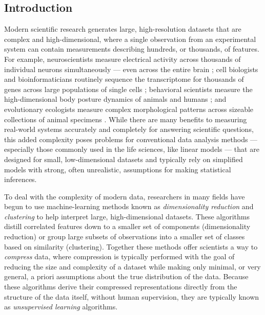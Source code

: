\documentclass[11pt,a4paper,twoside]{book}
\begin{document}
\begin{doublespace}
\section{Introduction}
Modern scientific research generates large, high-resolution datasets that are complex and high-dimensional, where a single observation from an experimental system can contain measurements describing hundreds, or thousands, of features. For example, neuroscientists measure electrical activity across thousands of individual neurons simultaneously \citep{jun2017fully, stringer2019high, stringer2019spontaneous} --- even across the entire brain \citep{ahrens2012brain,ahrens2013whole}; cell biologists and bioinformaticians routinely sequence the transcriptome for thousands of genes across large populations of single cells \citep{samusik2016automated, la2018rna, becht2019dimensionality, linderman2019fast}; behavioral scientists measure the high-dimensional body posture dynamics of animals and humans \citep{stephens2008dimensionality, stephens2011emergence, kain2013leg, berman2014mapping, wiltschko2015mapping, klibaite2017unsupervised, Costa1501, cande2018optogenetic, mathis2018deeplabcut, chambers2019pose, gunel2019deepfly3d, graving2019deepposekit, klibaite2019interacting,
nath2019using,pereira2019fast, bala2020openmonkeystudio, ebbesen2020social, karashchuk2020anipose}; and evolutionary ecologists measure complex morphological patterns across sizeable collections of animal specimens \citep{cuthill2017biology, cuthill2019deep, ezray2019unsupervised, wham2019measuring, zhang2019shell}. While there are many benefits to measuring real-world systems accurately and completely for answering scientific questions, this added complexity poses problems for conventional data analysis methods --- especially those commonly used in the life sciences, like linear models \citep{bolker2009generalized} --- that are designed for small, low-dimensional datasets and typically rely on simplified models with strong, often unrealistic, assumptions for making statistical inferences.

To deal with the complexity of modern data, researchers in many fields have begun to use machine-learning methods known as \textit{dimensionality reduction} and \textit{clustering} to help interpret large, high-dimensional datasets. These algorithms distill correlated features down to a smaller set of components (dimensionality reduction) or group large subsets of observations into a smaller set of classes based on similarity (clustering). Together these methods offer scientists a way to \textit{compress} data, where compression is typically performed with the goal of reducing the size and complexity of a dataset while making only minimal, or very general, a priori assumptions about the true distribution of the data. Because these algorithms derive their compressed representations directly from the structure of the data itself, without human supervision, they are typically known as \textit{unsupervised learning} algorithms. 


\end{doublespace}
\end{document}
